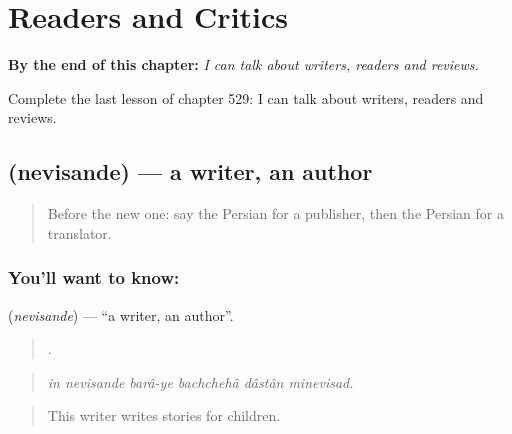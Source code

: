 
\chapter{Readers and Critics}
\label{ch:fa-readers-and-critics}

\begin{chapteropening}
\textbf{By the end of this chapter:} \emph{I can talk about writers, readers and reviews.}

Complete the last lesson of chapter 529: I can talk about writers, readers and reviews.
\end{chapteropening}

\section[\texorpdfstring{\fa{نویسنده} (nevisande)}{نویسنده (nevisande)}]{ (nevisande) — a writer, an author}

\label{lesson:FA-C529-nevisande}



\begin{quote}
Before the new one: say the Persian for a publisher, then the Persian for a translator.
\end{quote}

\subsection*{You'll want to know: }
\textbf{} (\emph{nevisande}) — \textquotedblleft{}a writer, an author\textquotedblright{}.

\begin{quote}
      .
\end{quote}

\begin{quote}
\emph{in nevisande barâ-ye bachchehâ dâstân minevisad.}
\end{quote}

\begin{quote}
This writer writes stories for children.
\end{quote}

